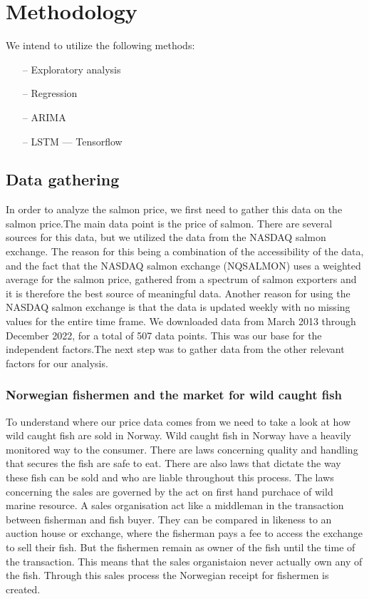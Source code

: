 \section{Methodology}

We intend to utilize the following methods:
\begin{itemize}
    \item[--] Exploratory analysis
    \item[--] Regression
    \item[--] ARIMA
    \item[--] LSTM --- Tensorflow
    \end{itemize}

\subsection{Data gathering}
In order to analyze the salmon price, we first need to gather this data on the salmon price.The main data point is the price of salmon. There are several sources for this data, but we utilized the data from the NASDAQ salmon exchange. The reason for this being a combination of the accessibility of the data, and the fact that the NASDAQ salmon exchange (NQSALMON) uses a weighted average for the salmon price, gathered from a spectrum of salmon exporters and it is therefore the best source of meaningful data. Another reason for using the NASDAQ salmon exchange is that the data is updated weekly with no missing values for the entire time frame. We downloaded data from March 2013 through December 2022, for a total of 507 data points. This was our base for the independent factors.The next step was to gather data from the other relevant factors for our analysis. 

\subsubsection{Norwegian fishermen and the market for wild caught fish}\label{Norwegian fishermen and the market for wild caught fish}
To understand where our price data comes from we need to take a look at how wild caught fish are sold in Norway. Wild caught fish in Norway have a heavily monitored way to the consumer. There are laws concerning quality and handling that secures the fish are safe to eat. There are also laws that dictate the way these fish can be sold and who are liable throughout this process. The laws concerning the sales are governed by the act on first hand purchace of wild marine resource. A sales organisation act like a middleman in the transaction between fisherman and fish buyer. They can be compared in likeness to an auction house or exchange, where the fisherman pays a fee to access the exchange to sell their fish. But the fishermen remain as owner of the fish until the time of the transaction. This means that the sales organistaion never actually own any of the fish. Through this sales process the Norwegian receipt for fishermen is created.\parencite{Nielsen_2022}


